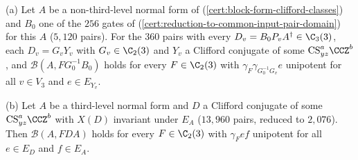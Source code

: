(a) Let $A$ be a non-third-level normal form of \textup{(\ref{cert:block-form-clifford-classes})} and $B_0$ one of the $256$ gates of \textup{(\ref{cert:reduction-to-common-input-pair-domain})} for this $A$ ($5{,}120$ pairs). For the $360$ pairs with every $D_v=B_0P_vA^\dagger\in\C_3(3)$, each $D_v=G_vY_v$ with $G_v\in\C_2(3)$ and $Y_v$ a Clifford conjugate of some $\mathrm{CS}_{yz}^a\CCZ^b$, and $\mathcal B(A,FG_0^{-1}B_0)$ holds for every $F\in\C_2(3)$ with $\gamma_F\gamma_{G_0^{-1}G_v}e$ unipotent for all $v\in V_3$ and $e\in E_{Y_v}$.

(b) Let $A$ be a third-level normal form and $D$ a Clifford conjugate of some $\mathrm{CS}_{yz}^a\CCZ^b$ with $X(D)$ invariant under $E_A$ ($13{,}960$ pairs, reduced to $2{,}076$). Then $\mathcal B(A,FDA)$ holds for every $F\in\C_2(3)$ with $\gamma_Fef$ unipotent for all $e\in E_D$ and $f\in E_A$.
